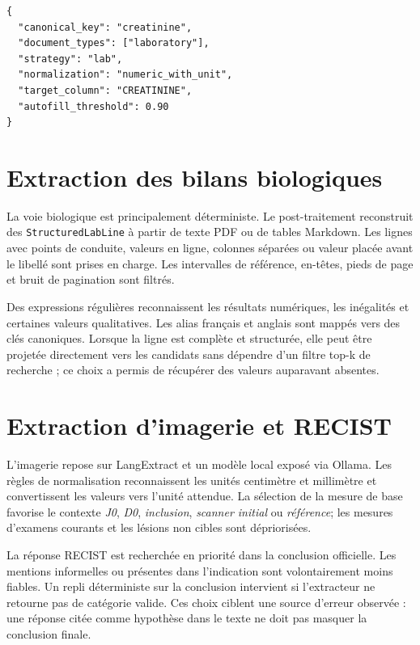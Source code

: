 \begin{lstlisting}[caption={Exemple simplifié de déclaration d'un champ dans le schéma d'étude},label={lst:schema}]
{
  "canonical_key": "creatinine",
  "document_types": ["laboratory"],
  "strategy": "lab",
  "normalization": "numeric_with_unit",
  "target_column": "CREATININE",
  "autofill_threshold": 0.90
}
\end{lstlisting}

\section{Extraction des bilans biologiques}
La voie biologique est principalement déterministe. Le post-traitement reconstruit des \texttt{StructuredLabLine} à partir de texte PDF ou de tables Markdown. Les lignes avec points de conduite, valeurs en ligne, colonnes séparées ou valeur placée avant le libellé sont prises en charge. Les intervalles de référence, en-têtes, pieds de page et bruit de pagination sont filtrés.

Des expressions régulières reconnaissent les résultats numériques, les inégalités et certaines valeurs qualitatives. Les alias français et anglais sont mappés vers des clés canoniques. Lorsque la ligne est complète et structurée, elle peut être projetée directement vers les candidats sans dépendre d'un filtre top-k de recherche ; ce choix a permis de récupérer des valeurs auparavant absentes.

\section{Extraction d'imagerie et RECIST}
L'imagerie repose sur LangExtract et un modèle local exposé via Ollama. Les règles de normalisation reconnaissent les unités centimètre et millimètre et convertissent les valeurs vers l'unité attendue. La sélection de la mesure de base favorise le contexte \emph{J0}, \emph{D0}, \emph{inclusion}, \emph{scanner initial} ou \emph{référence}; les mesures d'examens courants et les lésions non cibles sont dépriorisées.

La réponse RECIST est recherchée en priorité dans la conclusion officielle. Les mentions informelles ou présentes dans l'indication sont volontairement moins fiables. Un repli déterministe sur la conclusion intervient si l'extracteur ne retourne pas de catégorie valide. Ces choix ciblent une source d'erreur observée : une réponse citée comme hypothèse dans le texte ne doit pas masquer la conclusion finale.

